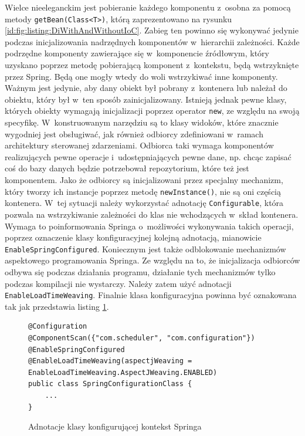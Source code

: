 \documentclass[a4paper]{book}
\begin{document}
{Wielce nieeleganckim jest pobieranie każdego komponentu z~osobna za pomocą metody \lstinline|getBean(Class<T>)|, którą zaprezentowano na rysunku \ref{id:fig:listing:DiWithAndWithoutIoC}. Zabieg ten powinno się wykonywać jedynie podczas inicjalizowania nadrzędnych komponentów w~hierarchii zależności. Każde podrzędne komponenty zawierające się w~komponencie źródłowym, który uzyskano poprzez metodę pobierającą komponent z~kontekstu, będą wstrzyknięte przez Spring. Będą one mogły wtedy do woli wstrzykiwać inne komponenty. Ważnym jest jedynie, aby dany obiekt był pobrany z~kontenera lub należał do obiektu, który był w~ten sposób zainicjalizowany. Istnieją jednak pewne klasy, których obiekty wymagają inicjalizacji poprzez operator \lstinline|new|, ze względu na swoją specyfikę. W~konstruowanym narzędziu są to klasy widoków, które znacznie wygodniej jest obsługiwać, jak również odbiorcy zdefiniowani w~ramach architektury sterowanej zdarzeniami. Odbiorca taki wymaga komponentów realizujących pewne operacje i~udostępniających pewne dane, np. chcąc zapisać coś do bazy danych będzie potrzebował repozytorium, które też jest komponentem. Jako że odbiorcy są inicjalizowani przez specjalny mechanizm, który tworzy ich instancje poprzez metodę \lstinline|newInstance()|, nie są oni częścią kontenera. W~tej sytuacji należy wykorzystać adnotację \lstinline|Configurable|, która pozwala na wstrzykiwanie zależności do klas nie wchodzących w~skład kontenera. Wymaga to poinformowania Springa o~możliwości wykonywania takich operacji, poprzez oznaczenie klasy konfiguracyjnej kolejną adnotacją, mianowicie \lstinline|EnableSpringConfigured|. Koniecznym jest także odblokowanie mechanizmów aspektowego programowania Springa. Ze względu na to, że inicjalizacja odbiorców odbywa się podczas działania programu, działanie tych mechanizmów tylko podczas kompilacji nie wystarczy. Należy zatem użyć adnotacji \lstinline|EnableLoadTimeWeaving|. Finalnie klasa konfiguracyjna powinna być oznakowana tak jak przedstawia listing \ref{id:fig:listing:ConfigurationSpring}.
\begin{figure}
\begin{lstlisting}
@Configuration
@ComponentScan({"com.scheduler", "com.configuration"})
@EnableSpringConfigured
@EnableLoadTimeWeaving(aspectjWeaving = EnableLoadTimeWeaving.AspectJWeaving.ENABLED)
public class SpringConfigurationClass {
	...
}
\end{lstlisting}
\caption{Adnotacje klasy konfigurującej kontekst Springa}
\label{id:fig:listing:ConfigurationSpring}
\end{figure}

}
\end{document}
